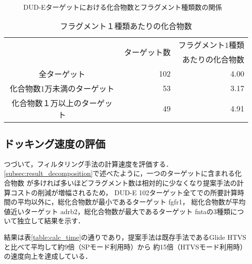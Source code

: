 \begin{figure}[bhtp]
 \begin{center}
  \caption{DUD-Eターゲットにおける化合物数とフラグメント種類数の関係}
  \label{fig:dude_decomposition}
 \end{center}
\end{figure}
\begin{table}[htb] \centering
	\caption{フラグメント１種類あたりの化合物数}
	\label{table:dude_decomposition}
	\begin{tabular}{c|rr}
	\hline
								&\multirow{2}{*}{ターゲット数}	&フラグメント1種類		\\
								&						&あたりの化合物数		\\ \hline
	全ターゲット					&102		&4.00							\\
	化合物数1万未満のターゲット		&53			&3.17							\\
	化合物数１万以上のターゲット	&49			&4.91							\\ \hline
	\end{tabular}
\end{table}


\subsection{ドッキング速度の評価}\label{subsec:single_calc_time}
つづいて，フィルタリング手法の計算速度を評価する．\ref{subsec:result_decomposition}で述べたように，一つのターゲットに含まれる化合物数
が多ければ多いほどフラグメント数は相対的に少なくなり提案手法の計算コストの削減が増幅されるため，
DUD-E 102ターゲット全てでの所要計算時間の平均以外に，総化合物数が最小であるターゲット fgfr1，
総化合物数が平均値近いターゲット adrb2，総化合物数が最大であるターゲット fntaの3種類について独立して結果を示す．

結果は表\ref{table:calc_time}の通りであり，提案手法は既存手法であるGlide HTVSと比べて平均して約9倍（SPモード利用時）から
約15倍（HTVSモード利用時）の速度向上を達成している．

